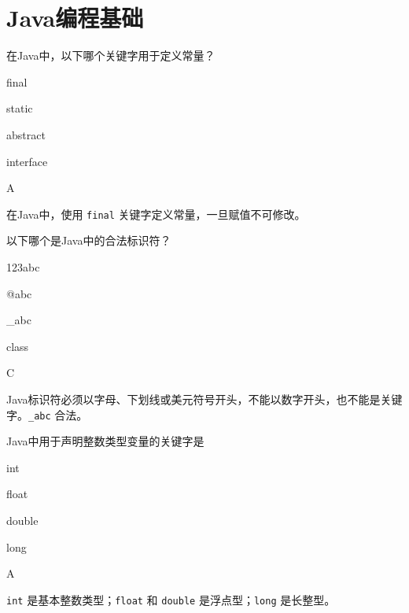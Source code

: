 \section{Java编程基础}

\begin{question}
	在Java中，以下哪个关键字用于定义常量？
	\begin{options}
		\item final
		\item static
		\item abstract
		\item interface
	\end{options}
	\begin{answer}
		A
	\end{answer}
	\begin{explanation}
		在Java中，使用 \texttt{final} 关键字定义常量，一旦赋值不可修改。
	\end{explanation}
\end{question}

\begin{question}
	以下哪个是Java中的合法标识符？
	\begin{options}
		\item 123abc
		\item @abc
		\item \_abc
		\item class
	\end{options}
	\begin{answer}
		C
	\end{answer}
	\begin{explanation}
		Java标识符必须以字母、下划线或美元符号开头，不能以数字开头，也不能是关键字。\texttt{\_abc} 合法。
	\end{explanation}
\end{question}

\begin{question}
	Java中用于声明整数类型变量的关键字是
	\begin{options}
		\item int
		\item float
		\item double
		\item long
	\end{options}
	\begin{answer}
		A
	\end{answer}
	\begin{explanation}
		\texttt{int} 是基本整数类型；\texttt{float} 和 \texttt{double} 是浮点型；\texttt{long} 是长整型。
	\end{explanation}
\end{question}

